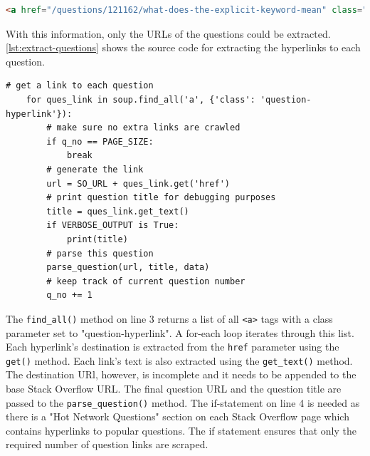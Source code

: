 \documentclass[12pt,a4paper]{article}
\newcommand{\captionstyle}[1] {
    \small{\textit{#1}}
}
\begin{document}
\begin{lstlisting}[language=html, caption={\captionstyle{An example hyperlink to a Stack Overflow question.}}, label={lst:hyperlink}]
    <a href="/questions/121162/what-does-the-explicit-keyword-mean" class="question-hyperlink">What does the explicit keyword mean?</a>
\end{lstlisting}

With this information, only the URLs of the questions could be extracted. \cref{lst:extract-questions} shows the source code for extracting the hyperlinks to each question.

\begin{lstlisting}[caption={\captionstyle{Extracting the URL of each question on a Stack Overflow page.}}, label={lst:extract-questions}]
    # get a link to each question
    for ques_link in soup.find_all('a', {'class': 'question-hyperlink'}):
        # make sure no extra links are crawled
        if q_no == PAGE_SIZE:
            break
        # generate the link
        url = SO_URL + ques_link.get('href')
        # print question title for debugging purposes
        title = ques_link.get_text()
        if VERBOSE_OUTPUT is True:
            print(title)
        # parse this question
        parse_question(url, title, data)
        # keep track of current question number
        q_no += 1
\end{lstlisting}

The \texttt{find\_all()} method on line 3 returns a list of all \texttt{<a>} tags with a class parameter set to "question-hyperlink". A for-each loop iterates through this list. Each hyperlink's destination is extracted from the \texttt{href} parameter using the \texttt{get()} method. Each link's text is also extracted using the \texttt{get\_text()} method. The destination URl, however, is incomplete and it needs to be appended to the base Stack Overflow URL. The final question URL and the question title are passed to the \texttt{parse\_question()} method. The if-statement on line 4 is needed as there is a "Hot Network Questions" section on each Stack Overflow page which contains hyperlinks to popular questions. The if statement ensures that only the required number of question links are scraped.
\end{document}
